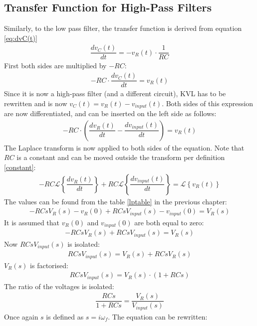 \subsection{Transfer Function for High-Pass Filters}
Similarly, to the low pass filter, the transfer function is derived from equation \eqref{eq:dvC(t)} 
\begin{align}
\dfrac{dv_{C}(t)}{dt} = -v_{R}(t) \cdot \dfrac{1}{RC}
\end{align}
First both sides are multiplied by $-RC$:
\begin{align}
-RC \cdot \dfrac{dv_{C}(t)}{dt} = v_{R}(t)
\end{align}
Since it is now a high-pass filter (and a different circuit), KVL has to be rewritten and is now $v_{C}(t)=v_{R}(t)-v_{input}(t)$. Both sides of this expression are now differentiated, and can be inserted on the left side as follows:
\begin{align*}
-RC \cdot \left(\dfrac{dv_{R}(t)}{dt} - \dfrac{dv_{input}(t)}{dt} \right) = v_{R}(t)
\end{align*}
The Laplace transform is now applied to both sides of the equation. Note that $RC$ is a constant and can be moved outside the transform per definition \ref{constant}:
\begin{align*}
-RC \mathcal{L} \left\{\dfrac{dv_{R}(t)}{dt} \right\} + RC \mathcal{L} \left\{ \dfrac{dv_{input}(t)}{dt} \right\} = \mathcal{L} \left\{v_{R}(t) \right\}
\end{align*}
The values can be found from the table \ref{lptable} in the previous chapter:
\begin{align*}
-RCsV_{R}(s)-v_{R}(0) + RCsV_{input}(s)-v_{input}(0) = V_{R}(s)
\end{align*}
It is assumed that $v_{R}(0)$ and $v_{input}(0)$ are both equal to zero:
\begin{align*}
-RCsV_{R}(s) + RCsV_{input}(s) = V_{R}(s)
\end{align*}
Now $RCs V_{input}(s)$ is isolated:
\begin{align*}
RCsV_{input}(s) = V_{R}(s) + RCsV_{R}(s)
\end{align*}
$V_{R}(s)$ is factorised:
\begin{align*}
RCsV_{input}(s) = V_{R}(s) \cdot (1 + RCs)
\end{align*}
The ratio of the voltages is isolated:
\begin{align} \label{hp:visolated}
\dfrac{RCs}{1 + RCs} = \dfrac{V_{R}(s)}{V_{input}(s)}
\end{align}
Once again $s$ is defined as $s=i\omega_f$. The equation can be rewritten:
